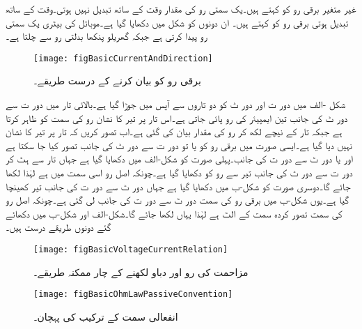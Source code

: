 غیر متغیر برقی رو کو  کہتے ہیں۔یک سمتی رو کی مقدار وقت کے ساتھ تبدیل نہیں ہوتی۔وقت کے ساتھ تبدیل ہوتی برقی رو کو  کہتے ہیں۔ ان دونوں کو شکل میں دکھایا گیا ہے۔موبائل کی بیٹری یک سمتی رو پیدا کرتی ہے جبکہ گھریلو پنکھا بدلتی رو سے چلتا ہے۔
\begin{figure}
\centering
\texttt{[image: figBasicCurrentAndDirection]}
\caption{برقی رو کو بیان کرنے کے درست طریقے۔}
\label{شکل_بنیادی_رو_درست_بیان}
\end{figure}

شکل -الف میں دور ت اور دور ٹ کو دو تاروں سے آپس میں جوڑا گیا ہے۔بالائی تار میں دور ت سے دور ٹ کی جانب تین ایمپیئر کی رو پائی جاتی ہے۔اس تار پر تیر کا نشان رو کی سمت کو ظاہر کرتا ہے جبکہ تار کے نیچے  لکھ کر رو کی مقدار بیان کی گئی ہے۔اب تصور کریں کہ تار پر تیر کا نشان نہیں دیا گیا ہے۔ایسی صورت میں برقی رو  کو یا تو دور ت سے دور ٹ کی جانب تصور کیا جا سکتا ہے اور یا دور ٹ سے دور ت کی جانب۔پہلی صورت کو شکل-الف میں دکھایا گیا ہے جہاں تار سے ہٹ کر دور ت سے دور ٹ کی جانب تیر سے رو  کو دکھایا گیا ہے۔چونکہ اصل رو اسی سمت میں ہے لہٰذا  لکھا جائے گا۔دوسری صورت کو شکل-ب میں دکھایا گیا ہے جہاں دور ٹ سے دور ت کی جانب تیر کھینچا گیا ہے۔یوں شکل-ب میں برقی رو کی سمت دور ٹ سے دور ت کی جانب لی گئی ہے۔چونکہ اصل رو کی سمت تصور کردہ سمت کے الٹ ہے لہٰذا یہاں  لکھا جائے گا۔شکل-الف اور شکل-ب میں دکھائے گئے دونوں طریقے درست ہیں۔
\begin{figure}
\centering
\texttt{[image: figBasicVoltageCurrentRelation]}
\caption{مزاحمت کی رو اور دباو لکھنے کے چار ممکنہ طریقے۔}
\label{شکل_بنیادی_غیر_عامل_ترکیب}
\end{figure}
%
\begin{figure}
\centering
\texttt{[image: figBasicOhmLawPassiveConvention]}
\caption{انفعالی سمت کے ترکیب کی پہچان۔}
\label{شکل_بنیادی_غیر_عامل_ترکیب_پہچان}
\end{figure}

